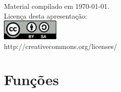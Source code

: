 \documentclass[portuguese,10pt,xcolor=table]{bredelebeamer}
\title{\insertlecture}
\author{Prof. Fernando Figueira\\(adaptado do material do Prof. Rafael Beserra Gomes)}
\institute
{
	UFRN
}
\date{}
\begin{document}
	\begin{frame}
		\maketitle
		\begin{center}
			\tiny
			Material compilado em \today.\\
			Licença desta apresentação:\\
			\includegraphics[height=1.0cm]{by-sa.png}\\
			http://creativecommons.org/licenses/
		\end{center}
	\end{frame}
	\def\GN[#1]{\colorbox{gray!40}{#1}}
	\def\RN[#1]{\colorbox{red!40}{#1}}
	\def\BN[#1]{\colorbox{blue!40}{#1}}
	\def\ON[#1]{\colorbox{orange!40}{#1}}
	\def\WN[#1]{\colorbox{white!40}{#1}}

	\section{Funções}
\end{document}
